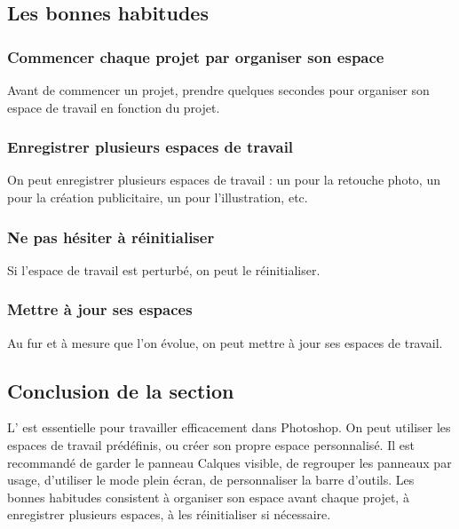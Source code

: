 \subsection{Les bonnes habitudes}

\subsubsection{Commencer chaque projet par organiser son espace}

Avant de commencer un projet, prendre quelques secondes pour organiser son espace de travail en fonction du projet.

\subsubsection{Enregistrer plusieurs espaces de travail}

On peut enregistrer plusieurs espaces de travail : un pour la retouche photo, un pour la création publicitaire, un pour l'illustration, etc.

\subsubsection{Ne pas hésiter à réinitialiser}

Si l'espace de travail est perturbé, on peut le réinitialiser.

\subsubsection{Mettre à jour ses espaces}

Au fur et à mesure que l'on évolue, on peut mettre à jour ses espaces de travail.

\subsection*{Conclusion de la section}

L' est essentielle pour travailler efficacement dans Photoshop. On peut utiliser les espaces de travail prédéfinis, ou créer son propre espace personnalisé. Il est recommandé de garder le panneau Calques visible, de regrouper les panneaux par usage, d'utiliser le mode plein écran, de personnaliser la barre d'outils. Les bonnes habitudes consistent à organiser son espace avant chaque projet, à enregistrer plusieurs espaces, à les réinitialiser si nécessaire.

